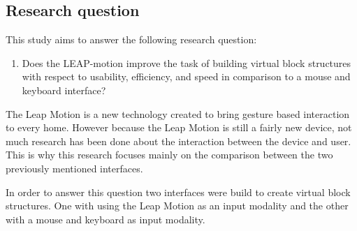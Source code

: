 \subsection{Research question}
This study aims to answer the following research question:
\begin{enumerate}
\item Does the LEAP-motion improve the task of building virtual block structures with respect to usability, efficiency, and speed in comparison to a mouse and keyboard interface?
\end{enumerate}
The Leap Motion is a new technology created to bring gesture based interaction to every home. 
However because the Leap Motion is still a fairly new device, not much research has been done about the interaction between the device and user.
This is why this research focuses mainly on the comparison between the two previously mentioned interfaces.  

In order to answer this question two interfaces were build to create virtual block structures. 
One with using the Leap Motion as an input modality and the other with a mouse and keyboard as input modality. 